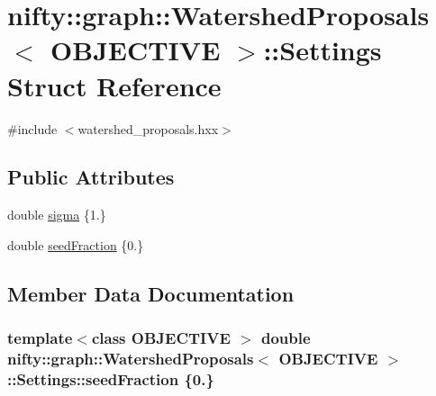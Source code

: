 \hypertarget{structnifty_1_1graph_1_1WatershedProposals_1_1Settings}{}\section{nifty\+:\+:graph\+:\+:Watershed\+Proposals$<$ O\+B\+J\+E\+C\+T\+I\+V\+E $>$\+:\+:Settings Struct Reference}
\label{structnifty_1_1graph_1_1WatershedProposals_1_1Settings}


{\ttfamily \#include $<$watershed\+\_\+proposals.\+hxx$>$}

\subsection*{Public Attributes}
\begin{DoxyCompactItemize}
\item 
double \hyperlink{structnifty_1_1graph_1_1WatershedProposals_1_1Settings_a604962a694ab8983b5a4aa914bf1c7eb}{sigma} \{1.\}
\item 
double \hyperlink{structnifty_1_1graph_1_1WatershedProposals_1_1Settings_acec1e038a96b305ab705ad0302cfe1ba}{seed\+Fraction} \{0.\}
\end{DoxyCompactItemize}


\subsection{Member Data Documentation}
\hypertarget{structnifty_1_1graph_1_1WatershedProposals_1_1Settings_acec1e038a96b305ab705ad0302cfe1ba}{}
\subsubsection[{seed\+Fraction}]{\setlength{\rightskip}{0pt plus 5cm}template$<$class O\+B\+J\+E\+C\+T\+I\+V\+E $>$ double {\bf nifty\+::graph\+::\+Watershed\+Proposals}$<$ O\+B\+J\+E\+C\+T\+I\+V\+E $>$\+::Settings\+::seed\+Fraction \{0.\}}\label{structnifty_1_1graph_1_1WatershedProposals_1_1Settings_acec1e038a96b305ab705ad0302cfe1ba}
\hypertarget{structnifty_1_1graph_1_1WatershedProposals_1_1Settings_a604962a694ab8983b5a4aa914bf1c7eb}{}

